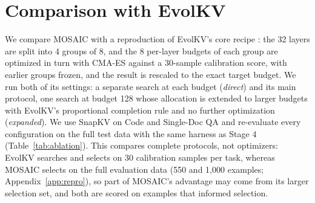 \documentclass[11pt]{article}
\begin{document}
\section{Comparison with EvolKV}
\label{sec:evolkv}

We compare MOSAIC with a reproduction of EvolKV's core recipe \citep{yu2025evolkv}: the 32 layers are split into 4 groups of 8, and the 8 per-layer budgets of each group are optimized in turn with CMA-ES against a 30-sample calibration score, with earlier groups frozen, and the result is rescaled to the exact target budget. We run both of its settings: a separate search at each budget (\emph{direct}) and its main protocol, one search at budget 128 whose allocation is extended to larger budgets with EvolKV's proportional completion rule and no further optimization (\emph{expanded}). We use SnapKV on Code and Single-Doc QA and re-evaluate every configuration on the full test data with the same harness as Stage 4 (Table~\ref{tab:ablation}). This compares complete protocols, not optimizers: EvolKV searches and selects on 30 calibration samples per task, whereas MOSAIC selects on the full evaluation data (550 and 1{,}000 examples; Appendix~\ref{app:repro}), so part of MOSAIC's advantage may come from its larger selection set, and both are scored on examples that informed selection.
\end{document}
